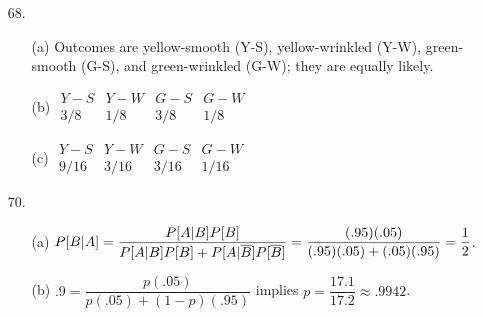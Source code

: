 \begin{enumerate}
	\item[68.] \begin{enumerate}
		\item[(a)] Outcomes are yellow-smooth (Y-S), yellow-wrinkled (Y-W), green-smooth (G-S), and green-wrinkled (G-W); they are equally likely.
		\item[(b)] $\begin{array}{c|c|c|c}
			Y-S & Y-W & G-S & G-W \\ \hline
			3/8 & 1/8 & 3/8 & 1/8 
		\end{array}$
		\item[(c)] $\begin{array}{c|c|c|c}
			Y-S & Y-W & G-S & G-W \\ \hline
			9/16 & 3/16 & 3/16 & 1/16 
		\end{array}$
	\end{enumerate}

	\item[70.] \begin{enumerate}
		\item[(a)] $\displaystyle P[B\vert A] = \dfrac{P[A\vert B]P[B]}{P[A\vert B]P[B] +P[A\vert \overline{B}]P[\overline{B}]} = \dfrac{(.95)(.05)}{(.95)(.05) + (.05)(.95)} = \dfrac{1}{2}$.
		\item[(b)] $.9 = \dfrac{p(.05)}{p(.05) + (1-p)(.95)}$ implies $p=\dfrac{17.1}{17.2} \approx .9942$.
	\end{enumerate}

	
\end{enumerate}







